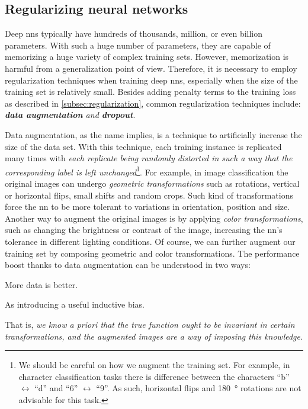 \subsection{Regularizing neural networks}
\label{subsec:regularization_nn}

Deep \glspl{nn} typically have hundreds of thousands, million, or even billion
parameters. With such a huge number of parameters, they are capable of
memorizing a huge variety of complex training sets. However,
memorization is harmful from a generalization point of view. Therefore, it
is necessary to employ regularization techniques when training deep \glspl{nn}, especially when the size of the
training set is relatively small.  Besides adding penalty terms to the training
loss as described in \Section{}
\ref{subsec:regularization}, common regularization techniques include:
\emph{\textbf{data augmentation} and
\textbf{dropout}}.

Data augmentation, as the name implies, is a technique to artificially increase
the size of the data set. With this technique, each training instance is
replicated many times with \emph{each replicate being randomly distorted in such
a way that the corresponding label is left unchanged}\footnote{We
should be careful on how we augment the training set. For example, in character
classification tasks there is difference between the characters ``b''
$\leftrightarrow$ ``d'' and ``6'' $\leftrightarrow$ ``9''. As such, horizontal
flips and \SI{180}{\degree} rotations are not advisable for this task.}. For
example, in image classification the original images can undergo \emph{geometric
transformations} such as rotations, vertical or
horizontal flips, small shifts and random crops. Such kind of transformations
force the \gls{nn} to be more tolerant to variations in orientation, position
and size. Another way to augment the original images is by applying \emph{color
transformations}, such as changing the brightness or contrast of the image,
increasing the \gls{nn}'s tolerance in different lighting conditions. Of course,
we can further augment our training set by composing geometric and color
transformations. The performance boost thanks to data augmentation can be
understood in two ways:
\begin{enumerate*}
	\item More data is better.
	\item As introducing a useful inductive bias.
\end{enumerate*}
That is, \emph{we know a priori that the true function ought to be invariant in
certain transformations, and the augmented images are a way of imposing
this knowledge}.

